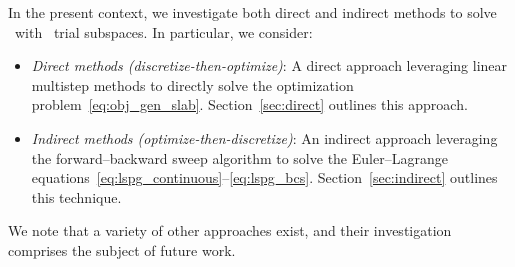 In the present context, we investigate both direct and indirect methods to solve \methodAcronym\ with \spatialAcronym\ trial
subspaces. In particular, we consider:
\begin{itemize} \item \textit{Direct methods (discretize-then-optimize)}: A direct approach leveraging linear multistep methods to directly solve the optimization problem~\eqref{eq:obj_gen_slab}.
Section~\ref{sec:direct} outlines this approach.
\item \textit{Indirect methods (optimize-then-discretize)}: An indirect
	approach leveraging the forward--backward sweep algorithm to solve the
		Euler--Lagrange equations~\eqref{eq:lspg_continuous}--\eqref{eq:lspg_bcs}.
Section~\ref{sec:indirect} outlines this technique.
\end{itemize} 
We note that a variety of other approaches exist, and their investigation
comprises the subject of future work.



